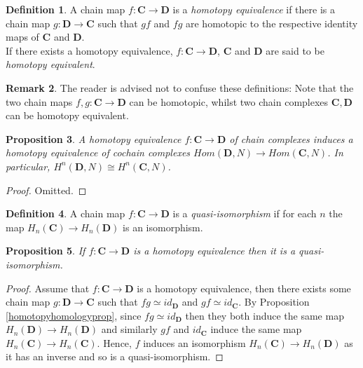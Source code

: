 \documentclass[11.5pt, twoside, a4paper, titlepage]{report}
\theoremstyle{definition}
\newtheorem{mydef}{Definition}[section]
\newtheorem{rem}[mydef]{Remark}
\theoremstyle{plain}
\newtheorem{prop}[mydef]{Proposition}
\begin{document}
\begin{mydef}
A chain map $f:\mathbf{C} \to \mathbf{D}$ is a \emph{homotopy equivalence} if there is a chain map $g:\mathbf{D} \to \mathbf{C}$ such that $gf$ and $fg$ are homotopic to the respective identity maps of $\mathbf{C}$ and $\mathbf{D}$.\\
If there exists a homotopy equivalence, $f:\mathbf{C} \to \mathbf{D}$, $\mathbf{C}$ and $\mathbf{D}$ are said to be \emph{homotopy equivalent}.
\end{mydef}


\begin{rem}
The reader is advised not to confuse these definitions: Note that the two chain maps $f,g:\mathbf{C} \to \mathbf{D}$ can be homotopic, whilst two chain complexes $\mathbf{C}, \mathbf{D}$ can be homotopy equivalent.
\end{rem}

\begin{prop}
A homotopy equivalence $f:\mathbf{C} \to \mathbf{D}$ of chain complexes induces a homotopy equivalence of cochain complexes $Hom(\mathbf{D},N) \to Hom(\mathbf{C},N)$. In particular, $H^n(\mathbf{D}, N) \cong H^n(\mathbf{C}, N)$.
\end{prop}
\begin{proof}
Omitted.
\end{proof}

\begin{mydef}
A chain map $f:\mathbf{C} \to \mathbf{D}$ is a \emph{quasi-isomorphism} if for each $n$ the map $H_n(\mathbf{C}) \to H_n(\mathbf{D})$ is an isomorphism.
\end{mydef}

\begin{prop} \label{homequivisomprop}
If $f:\mathbf{C} \to \mathbf{D}$ is a homotopy equivalence then it is a quasi-isomorphism.
\end{prop}
\begin{proof}
Assume that $f: \mathbf{C} \to \mathbf{D}$ is a homotopy equivalence, then there exists some chain map $g: \mathbf{D} \to \mathbf{C}$ such that $fg \simeq id_{\mathbf{D}}$ and $gf\simeq id_{\mathbf{C}}$. By Proposition \ref{homotopyhomologyprop}, since $fg \simeq id_{\mathbf{D}}$ then they both induce the same map $H_n(\mathbf{D}) \to H_n(\mathbf{D})$ and similarly $gf$ and $id_{\mathbf{C}}$ induce the same map $H_n(\mathbf{C}) \to H_n(\mathbf{C})$. Hence, $f$ induces an isomorphism $H_n(\mathbf{C}) \to H_n(\mathbf{D})$ as it has an inverse and so is a quasi-isomorphism.
\end{proof}
\end{document}
